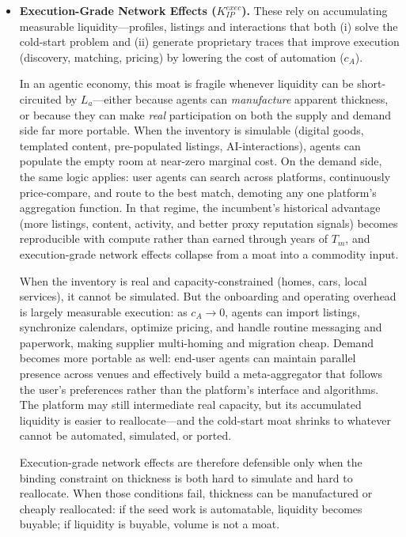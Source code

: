 \documentclass[12pt, letter]{article}
\begin{document}
\begin{itemize}
\item \textbf{Execution-Grade Network Effects ($K_{IP}^{exec}$).} These rely on accumulating measurable liquidity---profiles, listings and interactions that both (i) solve the cold-start problem and (ii) generate proprietary traces that improve execution (discovery, matching, pricing) by lowering the cost of automation ($c_A$).

    In an agentic economy, this moat is fragile whenever liquidity can be short-circuited by $L_a$---either because agents can \emph{manufacture} apparent thickness, or because they can make \emph{real} participation on both the supply and demand side far more portable. When the inventory is simulable (digital goods, templated content, pre-populated listings, AI-interactions), agents can populate the empty room at near-zero marginal cost. On the demand side, the same logic applies: user agents can search across platforms, continuously price-compare, and route to the best match, demoting any one platform’s aggregation function. In that regime, the incumbent’s historical advantage (more listings, content, activity, and better proxy reputation signals) becomes reproducible with compute rather than earned through years of $T_m$, and execution-grade network effects collapse from a moat into a commodity input.

    When the inventory is real and capacity-constrained (homes, cars, local services), it cannot be simulated. But the onboarding and operating overhead is largely measurable execution: as $c_A \to 0$, agents can import listings, synchronize calendars, optimize pricing, and handle routine messaging and paperwork, making supplier multi-homing and migration cheap. Demand becomes more portable as well: end-user agents can maintain parallel presence across venues and effectively build a meta-aggregator that follows the user’s preferences rather than the platform’s interface and algorithms. The platform may still intermediate real capacity, but its accumulated liquidity is easier to reallocate---and the cold-start moat shrinks to whatever cannot be automated, simulated, or ported.

    Execution-grade network effects are therefore defensible only when the binding constraint on thickness is both hard to simulate and hard to reallocate. When those conditions fail, thickness can be manufactured or cheaply reallocated: if the seed work is automatable, liquidity becomes buyable; if liquidity is buyable, volume is not a moat.


\end{itemize}
\end{document}
